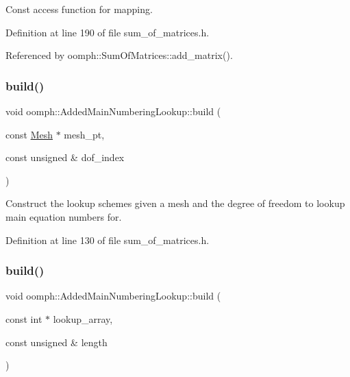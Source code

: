 Const access function for mapping. 



Definition at line 190 of file sum\+\_\+of\+\_\+matrices.\+h.



Referenced by oomph\+::\+Sum\+Of\+Matrices\+::add\+\_\+matrix().

\mbox{\label{classoomph_1_1AddedMainNumberingLookup_a8b0c78b4c7048915b3912af0b87f5a76}} 
\subsubsection{\texorpdfstring{build()}{build()}\hspace{0.1cm}{\footnotesize\ttfamily [1/3]}}
{\footnotesize\ttfamily void oomph\+::\+Added\+Main\+Numbering\+Lookup\+::build (\begin{DoxyParamCaption}\item[{const \hyperlink{classoomph_1_1Mesh}{Mesh} $\ast$}]{mesh\+\_\+pt,  }\item[{const unsigned \&}]{dof\+\_\+index }\end{DoxyParamCaption})\hspace{0.3cm}{\ttfamily [inline]}}

Construct the lookup schemes given a mesh and the degree of freedom to lookup main equation numbers for. 

Definition at line 130 of file sum\+\_\+of\+\_\+matrices.\+h.

\mbox{\label{classoomph_1_1AddedMainNumberingLookup_aea76ee043104c63f3ecbd641f98ae10d}} 
\subsubsection{\texorpdfstring{build()}{build()}\hspace{0.1cm}{\footnotesize\ttfamily [2/3]}}
{\footnotesize\ttfamily void oomph\+::\+Added\+Main\+Numbering\+Lookup\+::build (\begin{DoxyParamCaption}\item[{const int $\ast$}]{lookup\+\_\+array,  }\item[{const unsigned \&}]{length }\end{DoxyParamCaption})\hspace{0.3cm}{\ttfamily [inline]}}

